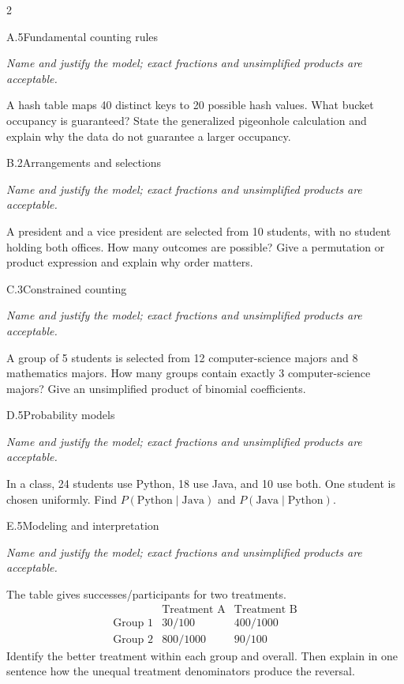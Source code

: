 \documentclass[9pt]{extarticle}
\begin{document}
\begin{multicols}{2}
\begin{CoreProblem}{A.5}{Fundamental counting rules}
{\scriptsize\textit{Name and justify the model; exact fractions and unsimplified products are acceptable.}\par}
A hash table maps 40 distinct keys to 20 possible hash values. What
    bucket occupancy is guaranteed? State the generalized pigeonhole calculation
    and explain why the data do not guarantee a larger occupancy.
\end{CoreProblem}
\begin{CoreProblem}{B.2}{Arrangements and selections}
{\scriptsize\textit{Name and justify the model; exact fractions and unsimplified products are acceptable.}\par}
A president and a vice president are selected from 10 students, with
    no student holding both offices. How many outcomes are possible? Give a
    permutation or product expression and explain why order matters.
\end{CoreProblem}
\begin{CoreProblem}{C.3}{Constrained counting}
{\scriptsize\textit{Name and justify the model; exact fractions and unsimplified products are acceptable.}\par}
A group of 5 students is selected from 12 computer-science majors and
    8 mathematics majors. How many groups contain exactly 3 computer-science
    majors? Give an unsimplified product of binomial coefficients.
\end{CoreProblem}
\columnbreak
\begin{CoreProblem}{D.5}{Probability models}
{\scriptsize\textit{Name and justify the model; exact fractions and unsimplified products are acceptable.}\par}
In a class, 24 students use Python, 18 use Java, and 10 use both.
    One student is chosen uniformly. Find
    $P(\text{Python}\mid\text{Java})$ and
    $P(\text{Java}\mid\text{Python})$.
\end{CoreProblem}
\begin{CoreProblem}{E.5}{Modeling and interpretation}
{\scriptsize\textit{Name and justify the model; exact fractions and unsimplified products are acceptable.}\par}
The table gives successes/participants for two treatments.
    \[
    \begin{array}{c|cc}
      &\text{Treatment A}&\text{Treatment B}\\\hline
      \text{Group 1}&30/100&400/1000\\
      \text{Group 2}&800/1000&90/100
    \end{array}
    \]
    Identify the better treatment within each group and overall. Then explain in
    one sentence how the unequal treatment denominators produce the reversal.
\end{CoreProblem}
\end{multicols}
\end{document}
